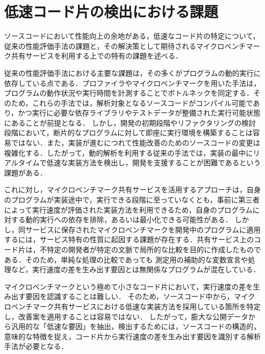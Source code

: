 \documentclass[11pt]{jreport}
\begin{document}


\section{低速コード片の検出における課題}

ソースコードにおいて性能向上の余地がある，低速なコード片の特定について，従来の性能評価手法の課題と，その解決策として期待されるマイクロベンチマーク共有サービスを利用する上での特有の課題を述べる．

従来の性能評価手法における主要な課題は，その多くがプログラムの動的実行に依存している点である．プロファイラやマイクロベンチマークを用いた手法は，プログラムの動作状況や実行時間を計測することでボトルネックを同定する．そのため，これらの手法では，解析対象となるソースコードがコンパイル可能であり，かつ実行に必要な依存ライブラリやテストデータが整備された実行可能状態にあることが前提となる．
しかし，開発の初期段階やリファクタリングの検討段階において，断片的なプログラムに対して即座に実行環境を構築することは容易ではない．また，実装が進むにつれて性能改善のためのソースコードの変更は複雑化する\cite{local2system}．したがって，動的解析を利用する従来の手法では，実装の最中にリアルタイムで低速な実装方法を検出し，開発を支援することが困難であるという課題がある．

これに対し，マイクロベンチマーク共有サービスを活用するアプローチは，自身のプログラムが実装途中で，実行できる段階に至っていなくとも，事前に第三者によって実行速度が評価された実装方法を利用できるため，自身のプログラムに対する動的実行への依存を排除，あるいは最小化できる可能性がある．
しかし，同サービスに保存されたマイクロベンチマークを開発中のプログラムに適用するには，サービス特有の性質に起因する課題が存在する．共有サービス上のコード片は，不特定の開発者が特定の文脈で局所的な比較を目的に作成したものである．そのため，単純な処理の比較であっても
測定用の補助的な変数宣言や処理など，実行速度の差を生み出す要因とは無関係なプログラムが混在している．

マイクロベンチマークという極めて小さなコード片において，実行速度の差を生み出す要因を認識することは難しい．
そのため，ソースコード中から，マイクロベンチマーク共有サービスにおける低速な実装方法を採用している箇所を特定し，改善案を適用することは容易ではない．
したがって，膨大な公開データから汎用的な「低速な要因」を抽出，検出するためには，ソースコードの構造的，意味的な特徴を捉え，コード片から実行速度の差を生み出す要因を識別する解析手法が必要となる．
\end{document}
